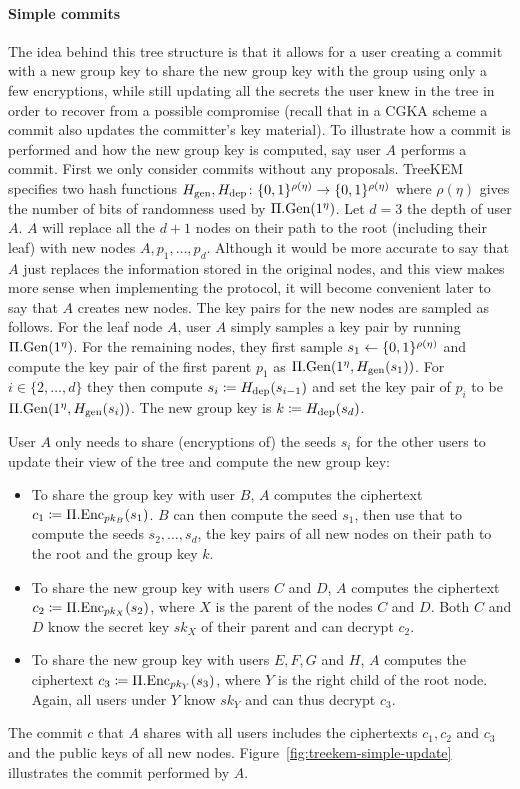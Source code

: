 \paragraph{Simple commits} \label{sec:simple-commit} The idea behind this tree structure is that it allows for a user creating a commit with a new group key to share the new group key with the group using only a few encryptions, while still updating all the secrets the user knew in the tree in order to recover from a possible compromise (recall that in a CGKA scheme a commit also updates the committer's key material).
To illustrate how a commit is performed and how the new group key is computed, say user $A$ performs a commit. First we only consider commits without any proposals. TreeKEM specifies two hash functions $H_\mathrm{gen}, H_\mathrm{dep} \colon \{0, 1\}^{\rho(\eta)} \to \{0, 1\}^{\rho(\eta)}$ where $\rho(\eta)$ gives the number of bits of randomness used by $\Pi.\mathrm{Gen}(1^\eta)$. Let $d = 3$ the depth of user $A$. $A$ will replace all the $d + 1$ nodes on their path to the root (including their leaf) with new nodes $A, p_1, \ldots, p_d$. Although it would be more accurate to say that $A$ just replaces the information stored in the original nodes, and this view makes more sense when implementing the protocol, it will become convenient later to say that $A$ creates new nodes.
The key pairs for the new nodes are sampled as follows. For the leaf node $A$, user $A$ simply samples a key pair by running $\Pi.\mathrm{Gen}(1^\eta)$. For the remaining nodes, they first sample $s_1 \leftarrow \{0, 1\}^{\rho(\eta)}$ and compute the key pair of the first parent $p_1$ as $\Pi.\mathrm{Gen}(1^\eta, H_\mathrm{gen}(s_1))$. For $i \in \{2, \ldots, d\}$ they then compute $s_i \coloneqq H_\mathrm{dep}(s_{i - 1})$ and set the key pair of $p_i$ to be $\Pi.\mathrm{Gen}(1^\eta, H_\mathrm{gen}(s_i))$. The new group key is $k \coloneqq H_\mathrm{dep}(s_{d})$.

User $A$ only needs to share (encryptions of) the seeds $s_i$ for the other users to update their view of the tree and compute the new group key:
\begin{itemize}
	\item To share the group key with user $B$, $A$ computes the ciphertext $c_1 \coloneqq \Pi.\mathrm{Enc}_{pk_B}(s_1)$. $B$ can then compute the seed $s_1$, then use that to compute the seeds $s_2, \ldots, s_d$, the key pairs of all new nodes on their path to the root and the group key $k$.
	\item To share the new group key with users $C$ and $D$, $A$ computes the ciphertext $c_2 \coloneqq \Pi.\mathrm{Enc}_{pk_X}(s_2)$, where $X$ is the parent of the nodes $C$ and $D$. Both $C$ and $D$ know the secret key $sk_X$ of their parent and can decrypt $c_2$.
	\item To share the new group key with users $E, F, G$ and $H$, $A$ computes the ciphertext $c_3 \coloneqq \Pi.\mathrm{Enc}_{pk_Y}(s_3)$, where $Y$ is the right child of the root node. Again, all users under $Y$ know $sk_Y$ and can thus decrypt $c_3$.
\end{itemize}
The commit $c$ that $A$ shares with all users includes the ciphertexts $c_1, c_2$ and $c_3$ and the public keys of all new nodes. Figure~\ref{fig:treekem-simple-update} illustrates the commit performed by $A$.

